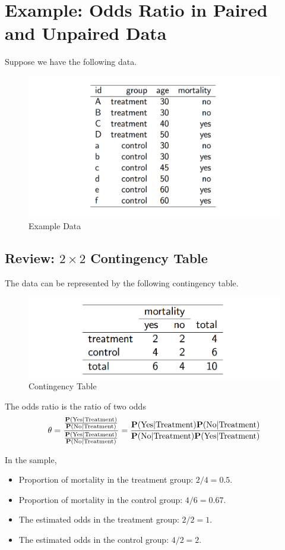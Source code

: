 \section{Example: Odds Ratio in Paired and Unpaired Data}
Suppose we have the following data.
\begin{figure}[H]
	\centering
	\includegraphics[width=0.7\linewidth]{fig/screenshot001}
	\caption{Example Data}
	\label{fig:screenshot001}
\end{figure}

\subsection{Review: $2 \times 2$ Contingency Table}
The data can be represented by the following contingency table.
\begin{figure}[H]
	\centering
	\includegraphics[width=0.7\linewidth]{fig/screenshot002}
	\caption{Contingency Table}
	\label{fig:screenshot002}
\end{figure}

The odds ratio is the ratio of two odds
\[
\theta 
= 
\frac
{\frac{\P(\text{Yes}|\text{Treatment})}{\P(\text{No}|\text{Treatment})}}
{\frac{\P(\text{Yes}|\text{Treatment})}{\P(\text{No}|\text{Treatment})}}
=\frac{\P(\text{Yes}|\text{Treatment})\P(\text{No}|\text{Treatment})}
{\P(\text{No}|\text{Treatment})\P(\text{Yes}|\text{Treatment})}
\]

In the sample,
\begin{itemize}
	\item Proportion of mortality in the treatment group: $2/4 = 0.5$.
	\item Proportion of mortality in the control group: $4/6 = 0.67$.
	\item The estimated odds in the treatment group: $2/2 = 1$.
	\item The estimated odds in the control group: $4/2 = 2$.
\end{itemize}

